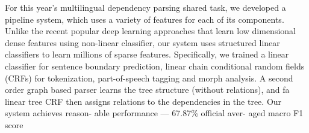 For this year's multilingual dependency parsing shared task, we developed a pipeline system, which uses a variety of features for each of its components. Unlike the recent popular deep learning approaches that learn low dimensional dense features using non-linear classifier, our system uses structured linear classifiers to learn millions of sparse features. Specifically, we trained a linear classifier for sentence boundary prediction, linear chain conditional random fields (CRFs) for tokenization, part-of-speech tagging and morph analysis. A second order graph based parser learns the tree structure (without relations), and fa linear tree CRF then assigns relations to the dependencies in the tree. Our system achieves reason- able performance --- 67.87\% official aver- aged macro F1 score
